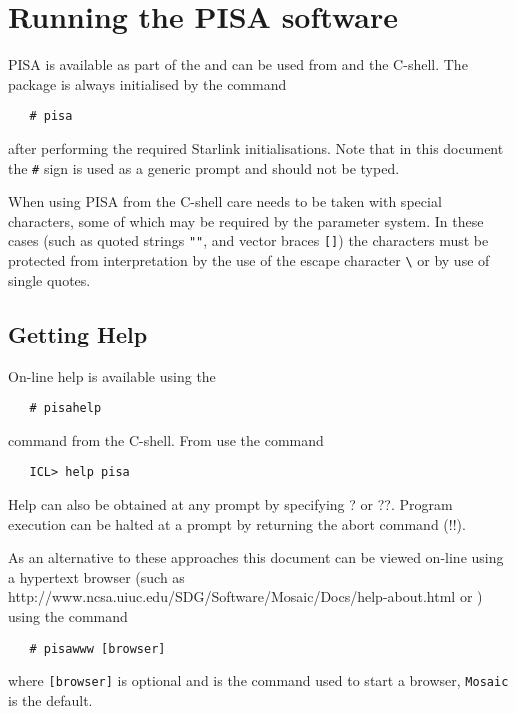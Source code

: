 \section{Running the PISA software}

PISA is available as part of the
and can be used from  and the C-shell. The package is always
initialised by the command
\begin{verbatim}
   # pisa
\end{verbatim}

after performing the required Starlink initialisations. Note that in this
document the \verb+#+ sign is used as a generic prompt and should not be typed.

When using PISA from the C-shell care needs to be taken with special
characters, some of which may be required by the parameter system. In
these cases (such as quoted strings \verb+""+, and vector braces
\verb+[]+) the characters must be protected from interpretation by the
use of the escape character \verb+\+ or by use of single quotes.

\subsection{Getting Help}

On-line help is available using the
\begin{verbatim}
   # pisahelp
\end{verbatim}
command from the C-shell. From  use the command
\begin{verbatim}
   ICL> help pisa
\end{verbatim}
Help can also be obtained at any prompt by specifying ? or ??. Program
execution can be halted at a prompt by returning the abort command (!!).

\begin{latexonly}
As an alternative to these approaches this document can be viewed
on-line using a hypertext browser (such as
{http://www.ncsa.uiuc.edu/SDG/Software/Mosaic/Docs/help-about.html}
or
) using the command
\begin{verbatim}
   # pisawww [browser]
\end{verbatim}
where \verb+[browser]+ is optional and is the command used to start
a browser, \verb+Mosaic+ is the default.
\end{latexonly}


